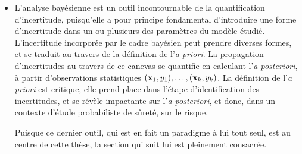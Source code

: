 \begin{itemize}
        Parmis les RKHS populaires, on peut citer celui défini par le noyau Gaussien (appelé aussi RBF) sur $\RR^d$: $k(x,y)=\exp(-\tau\|x-y\|^2_2)$ pour un certain $\tau>0$.




    \item L'analyse bayésienne est un outil incontournable de la quantification d'incertitude, puisqu'elle a pour principe fondamental d'introduire une forme d'incertitude dans un ou plusieurs des paramètres du modèle étudié. 
    L'incertitude incorporée par le cadre bayésien peut prendre diverses formes, et se traduit au travers de la définition de l'\emph{a priori}. 
    La propagation d'incertitudes au travers de ce canevas se quantifie en calculant l'\emph{a posteriori}, à partir d'observations statistiques $(\mathbf{x}_1,y_1),\dots,(\mathbf{x}_k, y_k)$.
    La définition de l'\emph{a priori} est critique, elle prend place dans l'étape d'identification des incertitudes, et se révèle impactante sur l'\emph{a posteriori}, et donc, dans un contexte d'étude probabiliste de sûreté, sur le risque.
    
    Puisque ce dernier outil, qui est en fait un paradigme à lui tout seul, est au centre de cette thèse, la section qui suit lui est pleinement consacrée.
\end{itemize}
















